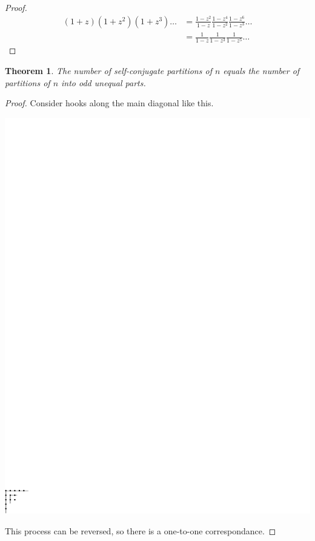 \documentclass{notes}
\theoremstyle{plain}
\newtheorem{theorem}{Theorem}[chapter]
\begin{document}
\begin{proof}
\begin{align*}
(1+z) (1+z^2) (1+z^3) \dots & = \frac{1-z^2}{1-z} \frac{1-z^4}{1-z^2}
\frac{1-z^6}{1-z^3} \dots \\
&= \frac{1}{1-z} \frac{1}{1-z^3} \frac{1}{1-z^5} \dots
\end{align*}
\end{proof}

\begin{theorem}
The number of self-conjugate partitions of $n$ equals the number of
partitions of $n$ into odd unequal parts.
\end{theorem}

\begin{proof}
Consider hooks along the main diagonal like this.

\begin{center}
\includegraphics{self-conj}
\end{center}

This process can be reversed, so there is a one-to-one correspondance.
\end{proof}
\end{document}
